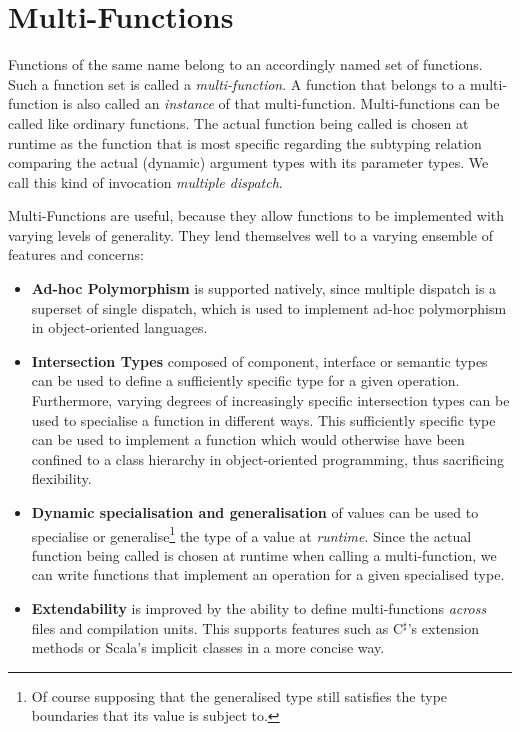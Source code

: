 \chapter{Multi-Functions}

Functions of the same name belong to an accordingly named set of functions. Such a function set is called a \textit{multi-function}. A function that belongs to a multi-function is also called an \textit{instance} of that multi-function. Multi-functions can be called like ordinary functions. The actual function being called is chosen at runtime as the function that is most specific regarding the subtyping relation comparing the actual (dynamic) argument types with its parameter types. We call this kind of invocation \textit{multiple dispatch}. 

Multi-Functions are useful, because they allow functions to be implemented with varying levels of generality. They lend themselves well to a varying ensemble of features and concerns:
\begin{itemize}
	\item \textbf{Ad-hoc Polymorphism} is supported natively, since multiple dispatch is a superset of single dispatch, which is used to implement ad-hoc polymorphism in object-oriented languages.
	\item \textbf{Intersection Types} composed of component, interface or semantic types can be used to define a sufficiently specific type for a given operation. Furthermore, varying degrees of increasingly specific intersection types can be used to specialise a function in different ways. This sufficiently specific type can be used to implement a function which would otherwise have been confined to a class hierarchy in object-oriented programming, thus sacrificing flexibility.
	\item \textbf{Dynamic specialisation and generalisation} of values can be used to specialise or generalise\footnote{Of course supposing that the generalised type still satisfies the type boundaries that its value is subject to.} the type of a value at \textit{runtime}. Since the actual function being called is chosen at runtime when calling a multi-function, we can write functions that implement an operation for a given specialised type.
	\item \textbf{Extendability} is improved by the ability to define multi-functions \textit{across} files and compilation units. This supports features such as C$^\sharp$'s extension methods or Scala's implicit classes in a more concise way.
\end{itemize}


